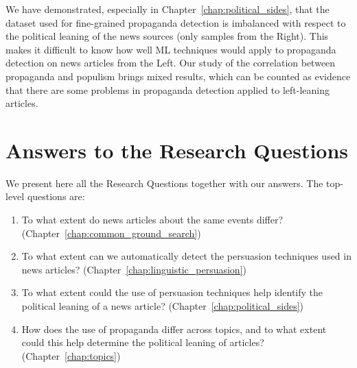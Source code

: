 \begin{enumerate}
    We have demonstrated, especially in Chapter~\ref{chap:political_sides}, that the dataset used for fine-grained propaganda detection is imbalanced with respect to the political leaning of the news sources (only samples from the Right). This makes it difficult to know how well ML techniques would apply to propaganda detection on news articles from the Left. Our study of the correlation between propaganda and populism brings mixed results, which can be counted as evidence that there are some problems in propaganda detection applied to left-leaning articles.
\end{enumerate}


\section{\statusgreen Answers to the Research Questions}
\label{sec:discussion_answers}

We present here all the Research Questions together with our answers. The top-level questions are:

\begin{enumerate}[label={\textbf{RQ\arabic*:}},leftmargin=1.6cm]
\item To what extent do news articles about the same events differ? (Chapter~\ref{chap:common_ground_search})
\item To what extent can we automatically detect the persuasion techniques used in news articles? (Chapter~\ref{chap:linguistic_persuasion})
\item To what extent could the use of persuasion techniques help identify the political leaning of a news article? (Chapter~\ref{chap:political_sides})
\item How does the use of propaganda differ across topics, and to what extent could this help determine the political leaning of articles? (Chapter~\ref{chap:topics})
\end{enumerate}


